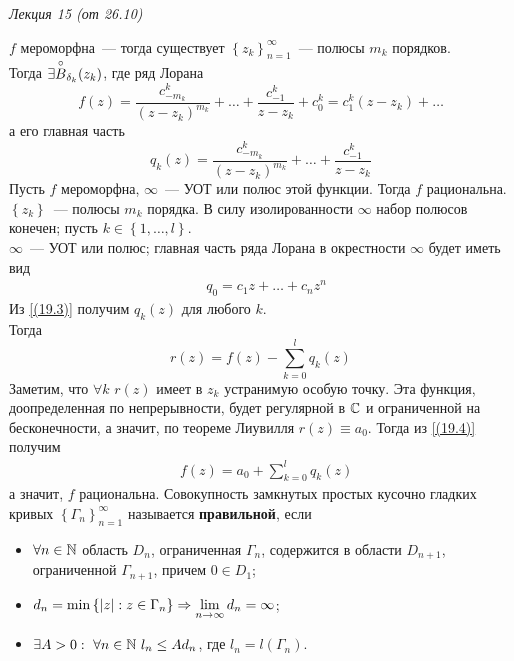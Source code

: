 \begin{flushright}
    \textit{Лекция 15 (от 26.10)}
\end{flushright}
$f$ мероморфна~--- тогда существует $\left\{ z_k \right\}_{n=1}^{\infty}$~---
полюсы $m_k$ порядков.
\\
Тогда $\exists \overset{\circ}{B}_{\delta_k}(z_k)$, где ряд Лорана
\begin{equation}\label{(19.2)}
    f(z) = \frac{c^k_{-m_k}}{(z-z_k)^{m_k}} + \dots + \frac{c^k_{-1}}{z-z_k} + c_0^k= c_1^k(z-z_k) + \dots
\end{equation}
а его главная часть
\begin{equation}\label{(19.3)}
    q_k(z) = \frac{c^k_{-m_k}}{(z-z_k)^{m_k}} + \dots + \frac{c^k_{-1}}{z-z_k}
\end{equation}
\theorem
Пусть $f$ мероморфна, $\infty$~--- УОТ или полюс этой функции. Тогда $f$
рациональна.
\pr
$\left\{ z_k \right\}$~--- полюсы $m_k$ порядка. В силу изолированности $\infty$
набор полюсов конечен; пусть $k \in \left\{ 1, \dots, l \right\}$.
\\
$\infty$~--- УОТ или полюс; главная часть ряда Лорана в окрестности $\infty$
будет иметь вид
\begin{align*}
  & q_0 = c_1z+\dots +c_nz^n
\end{align*}
Из \eqref{(19.3)} получим $q_k(z)$ для любого $k$.
\\
Тогда
\begin{equation}\label{(19.4)}
    r(z) = f(z) - \sum_{k=0}^lq_k(z)
\end{equation}
Заметим, что $\forall k$ $r(z)$ имеет в $z_k$ устранимую особую точку. Эта
функция, доопределенная по непрерывности, будет регулярной в $\mathbb{C}$ и
ограниченной на бесконечности, а значит, по теореме Лиувилля $r(z) \equiv a_0$.
Тогда из \eqref{(19.4)} получим
\begin{align*}
  & f(z) = a_0 + \sum_{k=0}^lq_k(z)
\end{align*}
а значит, $f$ рациональна.
\Def
Совокупность замкнутых простых кусочно гладких кривых $\left\{ \Gamma_n
\right\}_{n=1}^\infty$ называется \textbf{правильной}, если
\begin{itemize}
    \item $\forall n \in \mathbb{N}$ область $D_n$, ограниченная $\Gamma_n$, содержится
    в области $D_{n+1}$, ограниченной $\Gamma_{n+1}$, причем $0 \in D_1$;
    \item $d_n = \min \left\{ \left| z \right| : z \in \Gamma_n \right\}
    \Rightarrow \displaystyle \lim_{n \to \infty}d_n = \infty$;
    \item $\exists A > 0: \ \forall n \in \mathbb{N} \ l_n \leq Ad_n$, где $l_n  =
    l(\Gamma_n)$.
\end{itemize}
